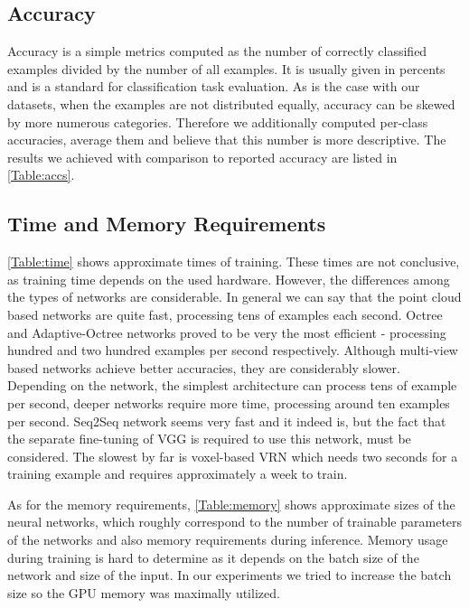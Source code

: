 \subsection{Accuracy}
Accuracy is a simple metrics computed as the number of correctly classified examples divided by the number of all examples. It is usually given in percents and is a standard for classification task evaluation. As is the case with our datasets, when the examples are not distributed equally, accuracy can be skewed by more numerous categories. Therefore we additionally computed per-class accuracies, average them and believe that this number is more descriptive. The results we achieved with comparison to reported accuracy are listed in \autoref{Table:accs}. 


\subsection{Time and Memory Requirements}
\autoref{Table:time} shows approximate times of training. These times are not conclusive, as training time depends on the used hardware. However, the differences among the types of networks are considerable. In general we can say that the point cloud based networks are quite fast, processing tens of examples each second. Octree and Adaptive-Octree networks proved to be very the most efficient - processing hundred and two hundred examples per second respectively. Although multi-view based networks achieve better accuracies, they are considerably slower. Depending on the network, the simplest architecture can process tens of example per second, deeper networks require more time, processing around ten examples per second. Seq2Seq network seems very fast and it indeed is, but the fact that the separate fine-tuning of VGG is required to use this network, must be considered. The slowest by far is voxel-based VRN which needs two seconds for a training example and requires approximately a week to train. \par

As for the memory requirements, \autoref{Table:memory} shows approximate sizes of the neural networks, which roughly correspond to the number of trainable parameters of the networks and also memory requirements during inference. Memory usage during training is hard to determine as it depends on the batch size of the network and size of the input. In our experiments we tried to increase the batch size so the GPU memory was maximally utilized. 


